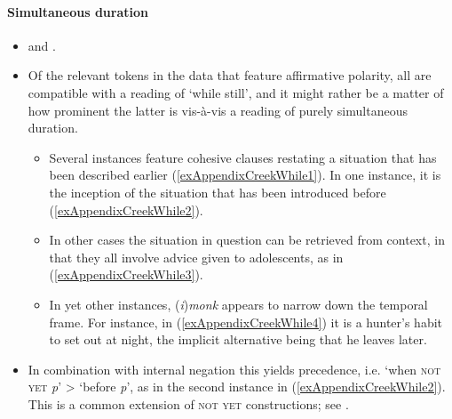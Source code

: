 \paragraph{Simultaneous duration}\label{appendixCreekWhile}
\begin{itemize}
	\item \textcite[404]{Martin2011} and \textcite[25]{MartinMcKaneMauldin2000}.
	\item Of the relevant tokens in the data that feature affirmative polarity, all are compatible with a reading of  \lq while still', and it might rather be a matter of how prominent the latter is vis-à-vis a reading of purely simultaneous duration.
	\begin{itemize}
		\item Several instances feature cohesive clauses restating a situation that has been described earlier (\ref{exAppendixCreekWhile1}). In one instance, it is the inception of the situation that has been introduced before (\ref{exAppendixCreekWhile2}).
		\item In other cases the situation in question can be retrieved from context, in that they all involve advice given to adolescents, as in (\ref{exAppendixCreekWhile3}).
		\item In yet other instances, (\textit{i})\textit{monk} appears to narrow down the temporal frame. For instance, in (\ref{exAppendixCreekWhile4}) it is a hunter's habit to set out at night, the implicit alternative being that he leaves later.	

		\end{itemize}
		\item In combination with internal negation this yields precedence, i.e. \lq when \textsc{not yet} \textit{p}\rq{ }> \lq before \textit{p}', as in the second instance in (\ref{exAppendixCreekWhile2}). This is a common extension of \textsc{not yet} constructions; see .
\end{itemize}

